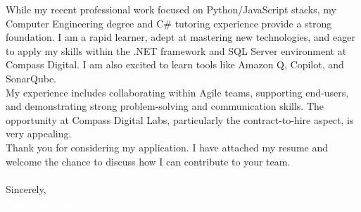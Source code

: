 \documentclass[9pt]{src/developercv}
\begin{document}
While my recent professional work focused on Python/JavaScript stacks, my Computer Engineering degree and C\# tutoring experience provide a strong foundation. I am a rapid learner, adept at mastering new technologies, and eager to apply my skills within the .NET framework and SQL Server environment at Compass Digital. I am also excited to learn tools like Amazon Q, Copilot, and SonarQube.\\

My experience includes collaborating within Agile teams, supporting end-users, and demonstrating strong problem-solving and communication skills. The opportunity at Compass Digital Labs, particularly the contract-to-hire aspect, is very appealing.\\

Thank you for considering my application. I have attached my resume and welcome the chance to discuss how I can contribute to your team.\\\\
\noindent Sincerely,\\
\colorbox{sky800}{\textcolor{white}{\large\textbf{Nasif Mauthoor}}}
\end{document}
